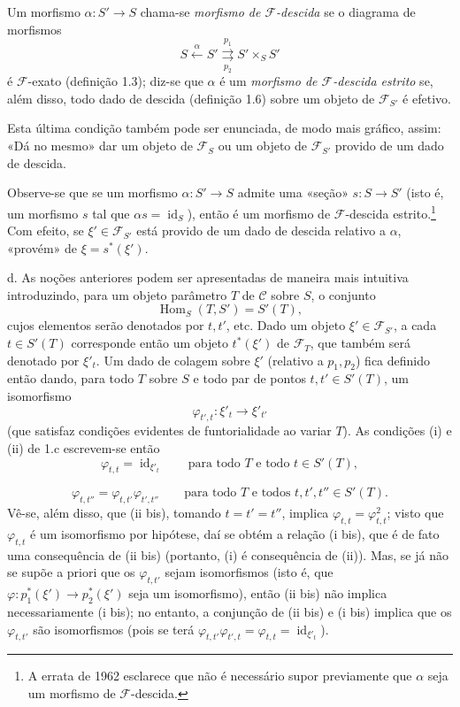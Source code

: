  Um morfismo $\alpha:S'\longrightarrow S$ chama-se
\emph{morfismo de $\mathcal F$-descida} se o diagrama de morfismos
\[
  S\xleftarrow{\alpha}S'
  \overset{p_1}{\underset{p_2}{\rightrightarrows}}S'\times_S S'
\]
é $\mathcal F$-exato (definição 1.3); diz-se que $\alpha$ é um
\emph{morfismo de $\mathcal F$-descida estrito} se, além disso, todo dado de
descida (definição 1.6) sobre um objeto de $\mathcal F_{S'}$ é efetivo.

Esta última condição também pode ser enunciada, de modo mais gráfico, assim:
«Dá no mesmo» dar um objeto de $\mathcal F_S$ ou um objeto de
$\mathcal F_{S'}$ provido de um dado de descida.

Observe-se que se um morfismo $\alpha:S'\longrightarrow S$ admite uma «seção»
$s:S\longrightarrow S'$ (isto é, um morfismo $s$ tal que
$\alpha s=\operatorname{id}_S$), então é um morfismo de
$\mathcal F$-descida estrito.\footnote{A errata de 1962 esclarece que não é
necessário supor previamente que $\alpha$ seja um morfismo de
$\mathcal F$-descida.} Com efeito, se $\xi'\in\mathcal F_{S'}$ está provido de
um dado de descida relativo a $\alpha$, «provém» de
$\xi=s^*(\xi')$.

\medskip\noindent
d. As noções anteriores podem ser apresentadas de maneira mais intuitiva
introduzindo, para um objeto parâmetro $T$ de $\mathcal C$ sobre $S$, o
conjunto
\[
  \operatorname{Hom}_S(T,S')=S'(T),
\]
cujos elementos serão denotados por $t,t'$, etc. Dado um objeto
$\xi'\in\mathcal F_{S'}$, a cada $t\in S'(T)$ corresponde então um objeto
$t^*(\xi')$ de $\mathcal F_T$, que também será denotado por $\xi'_t$. Um dado de
colagem sobre $\xi'$ (relativo a $p_1,p_2$) fica definido então dando, para
todo $T$ sobre $S$ e todo par de pontos $t,t'\in S'(T)$, um isomorfismo
\[
  \varphi_{t',t}:\xi'_t\longrightarrow\xi'_{t'}
\]
(que satisfaz condições evidentes de funtorialidade ao variar $T$). As
condições (i) e (ii) de 1.c escrevem-se então
\[
  \tag{i bis}
  \varphi_{t,t}=\operatorname{id}_{\xi'_t}
  \qquad\text{para todo $T$ e todo $t\in S'(T)$},
\]

\[
  \tag{ii bis}
  \varphi_{t,t''}=\varphi_{t,t'}\varphi_{t',t''}
  \qquad\text{para todo $T$ e todos $t,t',t''\in S'(T)$}.
\]
Vê-se, além disso, que (ii bis), tomando $t=t'=t''$, implica
$\varphi_{t,t}=\varphi_{t,t}^2$; visto que $\varphi_{t,t}$ é um isomorfismo
por hipótese, daí se obtém a relação (i bis), que é de fato uma consequência
de (ii bis) (portanto, (i) é consequência de (ii)). Mas, se já não se supõe
a priori que os $\varphi_{t,t'}$ sejam isomorfismos (isto é, que
$\varphi:p_1^*(\xi')\longrightarrow p_2^*(\xi')$ seja um isomorfismo), então
(ii bis) não implica necessariamente (i bis); no entanto, a conjunção de
(ii bis) e (i bis) implica que os $\varphi_{t,t'}$ são isomorfismos (pois se
terá
$\varphi_{t,t'}\varphi_{t',t}=\varphi_{t,t}=\operatorname{id}_{\xi'_t}$).

